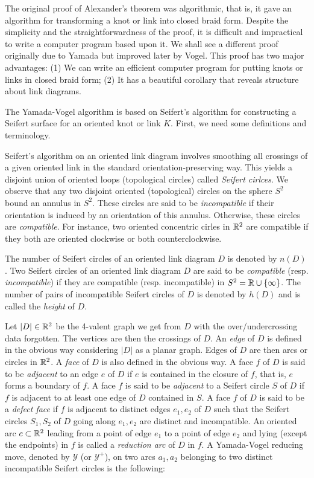 The original proof of Alexander's theorem was algorithmic, that is, it gave an algorithm for transforming a knot or link into closed braid form. Despite the simplicity and the straightforwardness of the proof, it is difficult and impractical to write a computer program based upon it. We shall see a different proof originally due to Yamada but improved later by Vogel. This proof has two major advantages: (1) We can write an efficient computer program for putting knots or links in closed braid form; (2) It has a beautiful corollary that reveals structure about link diagrams.

The Yamada-Vogel algorithm is based on Seifert's algorithm for constructing a Seifert surface for an oriented knot or link $K$. First, we need some definitions and terminology.

Seifert's algorithm on an oriented link diagram involves smoothing all crossings of a given oriented link in the standard orientation-preserving way. This yields a disjoint union of oriented loops (topological circles) called \emph{Seifert cirlces}. We observe that any two disjoint oriented (topological) circles on the sphere $S^2$ bound an annulus in $S^2$. These circles are said to be \emph{incompatible} if their orientation is induced by an orientation of this annulus. Otherwise, these circles are \emph{compatible}. For instance, two oriented concentric cirles in $\mathbb{R}^2$
are compatible if they both are oriented clockwise or both counterclockwise.

The number of Seifert circles of an oriented link diagram $D$ is denoted by $n(D)$. Two Seifert circles of an oriented link diagram $D$ are said to be \emph{compatible} (resp. \emph{incompatible}) if they are compatible (resp. incompatible) in $S^2 = \mathbb{R} \cup \{ \infty \}$. The number of pairs of incompatible Seifert circles of $D$ is denoted by $h(D)$ and is called the \emph{height} of $D$. 

Let $|D| \in \mathbb{R}^2$ be the 4-valent graph we get from $D$ with the over/undercrossing data forgotten. The vertices are then the crossings of $D$. An \emph{edge} of $D$ is defined in the obvious way considering $|D|$ as a planar graph. Edges of $D$ are then arcs or circles in $\mathbb{R}^2$. A \emph{face} of $D$ is also defined in the obvious way. A face $f$ of $D$ is said to be \emph{adjacent} to an edge $e$ of $D$ if $e$ is contained in the closure of $f$, that is, $e$ forms a boundary of $f$. A face $f$ is said to be \emph{adjacent} to a Seifert circle $S$ of $D$ if $f$ is adjacent to at least one edge of $D$ contained in $S$. A face $f$ of $D$ is said to be a \emph{defect face} if $f$ is adjacent to distinct edges $e_1, e_2$ of $D$ such that the Seifert circles $S_1, S_2$ of $D$ going along $e_1, e_2$ are distinct and incompatible. An oriented arc $c \subset \mathbb{R}^2$ leading from a point of edge $e_1$ to a point of edge $e_2$ and lying (except the endpoints) in $f$ is called a \emph{reduction arc} of $D$ in $f$. A Yamada-Vogel reducing move, denoted by $\mathcal{Y}$ (or $\mathcal{Y}^+$), on two arcs $a_1, a_2$ belonging to two distinct incompatible Seifert circles is the following:

